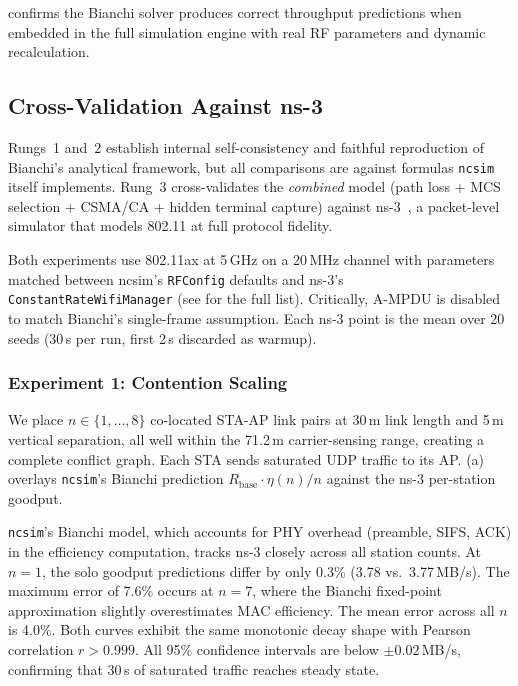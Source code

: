 \documentclass[conference]{IEEEtran}
\newcommand{\ncsim}{\texttt{ncsim}}
\begin{document}
 confirms the Bianchi solver produces correct throughput
predictions when embedded in the full simulation engine with real RF
parameters and dynamic recalculation.


\subsection{Cross-Validation Against ns-3}
\label{sec:ns3_validation}

Rungs~1 and~2 establish internal self-consistency and faithful
reproduction of Bianchi's analytical framework, but all comparisons are
against formulas \ncsim{} itself implements.  Rung~3 cross-validates the
\emph{combined} model (path loss + MCS selection + CSMA/CA + hidden
terminal capture) against ns-3~\cite{ns3}, a packet-level simulator
that models 802.11 at full protocol fidelity.

Both experiments use 802.11ax at 5\,GHz on a 20\,MHz channel with
parameters matched between ncsim's \texttt{RFConfig} defaults and ns-3's
\texttt{ConstantRateWifiManager} (see  for the full
list).  Critically, A-MPDU is disabled to match Bianchi's single-frame
assumption.  Each ns-3 point is the mean over 20 seeds (30\,s per run,
first 2\,s discarded as warmup).

\subsubsection{Experiment 1: Contention Scaling}

We place $n \in \{1, \ldots, 8\}$ co-located STA-AP link pairs at 30\,m
link length and 5\,m vertical separation, all well within the 71.2\,m
carrier-sensing range, creating a complete conflict graph.  Each STA sends
saturated UDP traffic to its AP.  (a) overlays
\ncsim{}'s Bianchi prediction $R_{\text{base}} \cdot \eta(n)/n$ against the
ns-3 per-station goodput.

\ncsim{}'s Bianchi model, which accounts for PHY overhead (preamble, SIFS,
ACK) in the efficiency computation, tracks ns-3 closely across all station
counts.  At $n{=}1$, the solo goodput predictions differ by only 0.3\%
(3.78 vs.\ 3.77\,MB/s).  The maximum error of 7.6\% occurs at $n{=}7$,
where the Bianchi fixed-point approximation slightly overestimates MAC
efficiency.  The mean error across all $n$ is 4.0\%.  Both curves exhibit
the same monotonic decay shape with Pearson correlation $r > 0.999$.  All
95\% confidence intervals are below $\pm 0.02$\,MB/s, confirming that
30\,s of saturated traffic reaches steady state.
\end{document}
